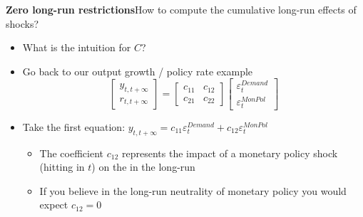 \documentclass[10pt,english,t,aspectratio=169,ignorenonframetext]{beamer}
\begin{document}

\begin{frame}
{\textbf{Zero long-run restrictions}}{How to compute the cumulative long-run
effects of shocks?}\bigskip

\begin{itemize}
\item What is the intuition for $C$?\bigskip

\item Go back to our output growth / policy rate example 
\begin{equation*}
\begin{bmatrix}
y_{t,t+\infty } \\ 
r_{t,t+\infty }%
\end{bmatrix}%
=\left[ 
\begin{array}{cc}
c_{11} & c_{12} \\ 
c_{21} & c_{22}%
\end{array}%
\right] 
\begin{bmatrix}
\varepsilon _{t}^{Demand} \\ 
\varepsilon _{t}^{MonPol}%
\end{bmatrix}%
\end{equation*}%
\pause

\item Take the first equation: $y_{t,t+\infty }=c_{11}\varepsilon
_{t}^{Demand}+c_{12}\varepsilon _{t}^{MonPol}$\smallskip

\begin{itemize}
\item The coefficient $c_{12}$ represents the impact of a monetary policy
shock (hitting in $t$) on the {} in the long-run\medskip 
{}

\item If you believe in the long-run neutrality of monetary policy you would
expect $c_{12}=0$
\end{itemize}
\end{itemize}
\end{frame}

\end{document}
